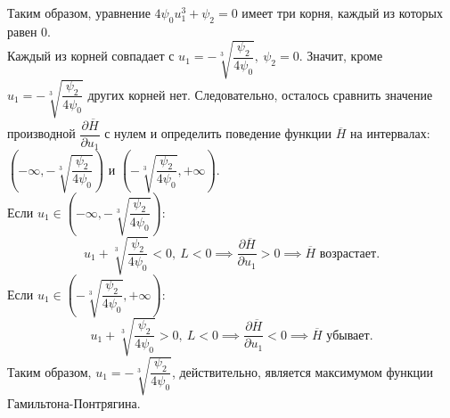 \documentclass{article}
\begin{document}
Таким образом, уравнение $4\psi_0u_1^3 +\psi_2 = 0$ имеет три корня, каждый из которых равен 0.\\
Каждый из корней совпадает с $u_1 = -\sqrt[3]{\dfrac{\psi_2}{4\psi_0}}, ~\psi_2=0.$ Значит, кроме $u_1 = -\sqrt[3]{\dfrac{\psi_2}{4\psi_0}}$ других корней нет. Следовательно, осталось сравнить значение производной $\dfrac{\partial\overline{H}}{\partial u_1}$ с нулем и определить поведение функции $\overline{H}$ на интервалах: $\left(-\infty, -\sqrt[3]{\dfrac{\psi_2}{4\psi_0}}\right)$ и $\left(-\sqrt[3]{\dfrac{\psi_2}{4\psi_0}}, +\infty\right)$. \vspace{5pt}\\
Если $u_1\in\left(-\infty, -\sqrt[3]{\dfrac{\psi_2}{4\psi_0}}\right):$
$$u_1+\sqrt[3]{\dfrac{\psi_2}{4\psi_0}} < 0, ~L < 0 \implies \dfrac{\partial\overline{H}}{\partial u_1} > 0 \implies \overline{H} \text{ возрастает.}$$
Если $u_1\in\left(-\sqrt[3]{\dfrac{\psi_2}{4\psi_0}}, +\infty\right):$
$$u_1+\sqrt[3]{\dfrac{\psi_2}{4\psi_0}} > 0, ~L < 0 \implies \dfrac{\partial\overline{H}}{\partial u_1} < 0 \implies \overline{H} \text{ убывает.}$$
Таким образом, $u_1 =  -\sqrt[3]{\dfrac{\psi_2}{4\psi_0}}$, действительно, является максимумом функции Гамильтона-Понтрягина.\\
\end{document}
